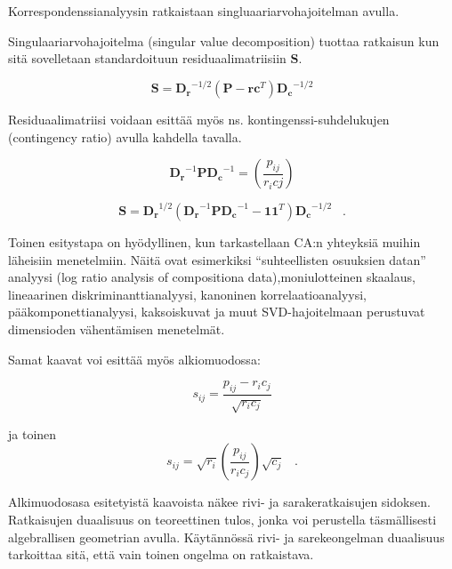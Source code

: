 \documentclass[
  finnish,
]{book}
\begin{document}
Korrespondenssianalyysin ratkaistaan singluaariarvohajoitelman avulla.

Singulaariarvohajoitelma (singular value decomposition) tuottaa ratkaisun kun
sitä sovelletaan standardoituun residuaalimatriisiin \(\boldsymbol{S}\).

\begin{equation}
\boldsymbol{S} = \boldsymbol{D_r}^{-1/2}(\boldsymbol{P} - \boldsymbol{r}\boldsymbol{c}^T)\boldsymbol{D_c}^{-1/2}
\label{eq:svd1}
\end{equation}

Residuaalimatriisi voidaan esittää myös ns. kontingenssi-suhdelukujen
(contingency ratio) avulla kahdella tavalla.

\begin{equation}
\boldsymbol{D_r}^{-1} \boldsymbol{P} \boldsymbol{D_c}^{-1} = \left( \frac{p_{ij}} {r_{i} c{j}} \right)
\label{eq:contrat1}
\end{equation}

\begin{equation}
\boldsymbol{S} = \boldsymbol{D_r}^{1/2} (\boldsymbol{D_r}^{-1} \boldsymbol{P} \boldsymbol{D_c}^{-1} - \boldsymbol{1}\boldsymbol{1}^{T} ) \boldsymbol{D_c}^{-1/2}  \;\;\; .
\label{eq:contrat2}
\end{equation}

Toinen esitystapa on hyödyllinen, kun tarkastellaan CA:n yhteyksiä muihin
läheisiin menetelmiin. Näitä ovat esimerkiksi ``suhteellisten osuuksien datan''
analyysi (log ratio analysis of compositiona data),moniulotteinen skaalaus,
lineaarinen diskriminanttianalyysi, kanoninen korrelaatioanalyysi,
pääkomponettianalyysi, kaksoiskuvat ja muut SVD-hajoitelmaan perustuvat dimensioden
vähentämisen menetelmät.

Samat kaavat voi esittää myös alkiomuodossa:

\begin{equation}
s_{ij} = \frac{p_{ij}-r_{i}c_{j}} { \sqrt{r_{i}c_{j} } }
\label{eq:contrat11}
\end{equation}

ja toinen
\begin{equation}
s_{ij} = \sqrt{r_{i}} \left( \frac{p_{ij}}{r_{i}c_{j}} \right) \sqrt{c_{j}} \;\;\; .
\label{eq:contrat21}
\end{equation}

Alkimuodosasa esitetyistä kaavoista näkee rivi- ja sarakeratkaisujen sidoksen.
Ratkaisujen duaalisuus on teoreettinen tulos, jonka voi perustella täsmällisesti
algebrallisen geometrian avulla. Käytännössä rivi- ja sarekeongelman duaalisuus
tarkoittaa sitä, että vain toinen ongelma on ratkaistava.
\end{document}
